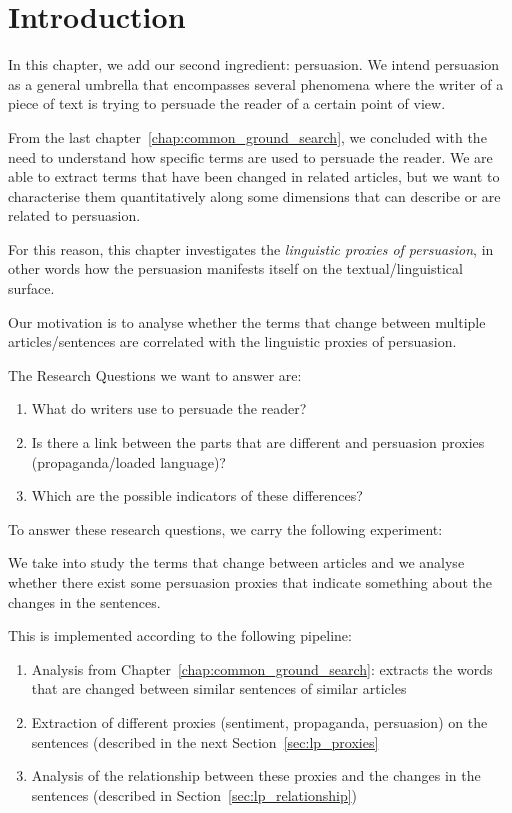 \label{chap:linguistic_persuasion}

\section{\statusgreen Introduction}
\label{sec:lp_intro}

In this chapter, we add our second ingredient: persuasion. We intend persuasion as a general umbrella that encompasses several phenomena where the writer of a piece of text is trying to persuade the reader of a certain point of view.

From the last chapter~\ref{chap:common_ground_search}, we concluded with the need to understand how specific terms are used to persuade the reader. We are able to extract terms that have been changed in related articles, but we want to characterise them quantitatively along some dimensions that can describe or are related to persuasion.

For this reason, this chapter investigates the \emph{linguistic proxies of persuasion}, in other words how the persuasion manifests itself on the textual/linguistical surface.

Our motivation is to analyse whether the terms that change between multiple articles/sentences are correlated with the linguistic proxies of persuasion.

The Research Questions we want to answer are: 
\begin{enumerate}
    \item What do writers use to persuade the reader?
    \item Is there a link between the parts that are different and persuasion proxies (propaganda/loaded language)?
    \item Which are the possible indicators of these differences? 
\end{enumerate}



To answer these research questions, we carry the following experiment:

We take into study the terms that change between articles and we analyse whether there exist some persuasion proxies that indicate something about the changes in the sentences.

This is implemented according to the following pipeline:
\begin{enumerate}
    \item Analysis from Chapter~\ref{chap:common_ground_search}: extracts the words that are changed between similar sentences of similar articles
    \item Extraction of different proxies (sentiment, propaganda, persuasion) on the sentences (described in the next Section~\ref{sec:lp_proxies}
    \item Analysis of the relationship between these proxies and the changes in the sentences (described in Section~\ref{sec:lp_relationship})
\end{enumerate}


